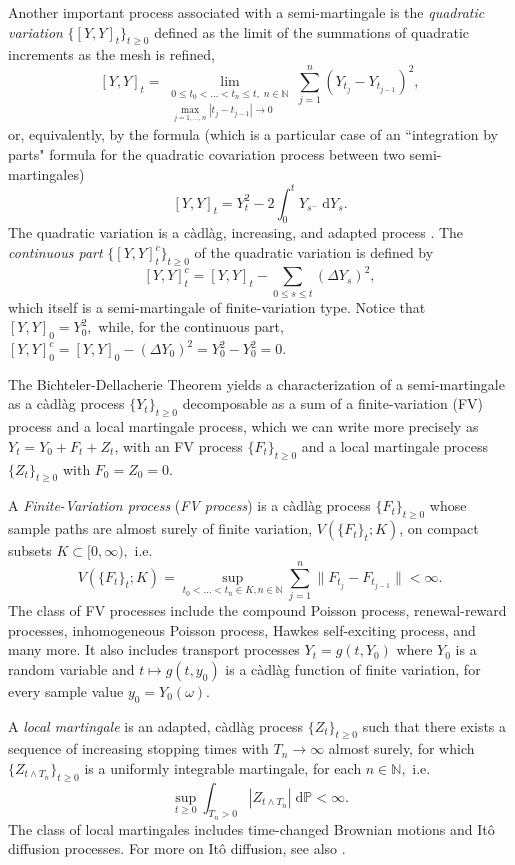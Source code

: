 \documentclass[reqno,12pt]{amsart}
\theoremstyle{plain} %
\theoremstyle{definition} %
\begin{document}
Another important process associated with a semi-martingale is the \emph{quadratic variation} $\{[Y, Y]_t\}_{t\geq 0}$ defined as the limit of the summations of quadratic increments as the mesh is refined,
\[
    [Y, Y]_t = \lim_{\substack{0\leq t_0 < \ldots < t_n \leq t, \;n\in \mathbb{N} \\ \max_{j=1, \ldots, n}|t_j - t_{j-1}| \rightarrow 0}} \sum_{j=1}^n (Y_{t_j} - Y_{t_{j-1}})^2,
\]
or, equivalently, by the formula (which is a particular case of an ``integration by parts" formula for the quadratic covariation process between two semi-martingales)
\[
    [Y, Y]_t = Y_t^2 - 2\int_0^t Y_{s^-} \;\mathrm{d}Y_s.
\]
The quadratic variation is a c\`adl\`ag, increasing, and adapted process \cite[Theorem II.22]{Protter2005}. The \emph{continuous part} $\{[Y, Y]_t^c\}_{t\geq 0}$ of the quadratic variation is defined by
\[
    [Y, Y]_t^c = [Y, Y]_t - \sum_{0\leq s \leq t} \left(\Delta Y_s\right)^2,
\]
which itself is a semi-martingale of finite-variation type. Notice that $[Y, Y]_0 = Y_0^2,$ while, for the continuous part, $[Y, Y]_0^c = [Y, Y]_0 - \left(\Delta Y_0\right)^2 = Y_0^2 - Y_0^2 = 0.$

The Bichteler-Dellacherie Theorem \cite[Theorem III.47]{Protter2005} yields a characterization of a semi-martingale as a c\`adl\`ag process $\{Y_t\}_{t\geq 0}$ decomposable as a sum of a finite-variation (FV) process and a local martingale process, which we can write more precisely as $Y_t = Y_0 + F_t + Z_t$, with an FV process $\{F_t\}_{t\geq 0}$ and a local martingale process $\{Z_t\}_{t\geq 0}$ with $F_0 = Z_0 = 0.$

A \emph{Finite-Variation process} (\emph{FV process}) is a c\`adl\`ag process $\{F_t\}_{t \geq 0}$ whose sample paths are almost surely of finite variation, $V(\{F_t\}_t; K)$, on compact subsets $K\subset [0, \infty),$ i.e.
\[ V(\{F_t\}_t; K) = \sup_{t_0 < \ldots < t_n \in K, n\in \mathbb{N}} \sum_{j=1}^n \|F_{t_j} - F_{t_{j-1}}\| < \infty.
\]
The class of FV processes include the compound Poisson process, renewal-reward processes, inhomogeneous Poisson process, Hawkes self-exciting process, and many more. It also includes transport processes $Y_t = g(t, Y_0)$ where $Y_0$ is a random variable and $t \mapsto g(t, y_0)$ is a c\`adl\`ag function of finite variation, for every sample value $y_0=Y_0(\omega)$.

A \emph{local martingale} is an adapted, c\`adl\`ag process $\{Z_t\}_{t\geq 0}$ such that there exists a sequence of increasing stopping times with $T_n \rightarrow \infty$ almost surely, for which $\{Z_{t \wedge T_n}\}_{t \geq 0}$ is a uniformly integrable martingale, for each $n\in\mathbb{N},$ i.e.
\[
    \sup_{t \geq 0} \int_{T_n > 0}|Z_{t\wedge T_n}|\;\mathrm{d}\mathbb{P} < \infty.
\]
The class of local martingales includes time-changed Brownian motions and It\^o diffusion processes. For more on It\^o diffusion, see also \cite{Oksendal2003}.
\end{document}
